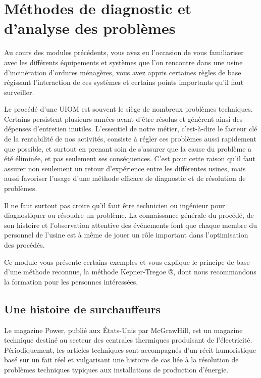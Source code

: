 
\chapter{Méthodes de diagnostic et d'analyse des problèmes}


Au cours des modules précédents, vous avez eu l’occasion de vous familiariser avec les différents équipements et systèmes que l’on rencontre dans une usine d’incinération d’ordures ménagères, vous avez appris certaines règles de base régissant l’interaction de ces systèmes et certains points importants qu’il faut surveiller.
\vspace{0.3cm}

Le procédé d’une UIOM est souvent le siège de nombreux problèmes techniques. Certains persistent plusieurs années avant d’être résolus et génèrent ainsi des dépenses d’entretien inutiles. L’essentiel de notre métier, c’est-à-dire le facteur clé de la rentabilité de nos activités, consiste à régler ces problèmes aussi rapidement que possible, et surtout en prenant soin de s’assurer que la cause du problème a été éliminée, et pas seulement ses conséquences.
C’est pour cette raison qu’il faut assurer non seulement un retour d’expérience entre les différentes usines, mais aussi favoriser l’usage d’une méthode efficace de diagnostic et de résolution de problèmes.
\vspace{0.3cm}

Il ne faut surtout pas croire qu’il faut être technicien ou ingénieur pour diagnostiquer ou résoudre un problème. La connaissance générale du procédé, de son histoire et l’observation attentive des événements font que chaque membre du personnel de l’usine est à même de jouer un rôle important dans l’optimisation des procédés.
\vspace{0.3cm}

Ce module vous présente certains exemples et vous explique le principe de base d’une méthode reconnue, la méthode Kepner-Tregoe ®, dont nous recommandons la formation pour les personnes intéressées.



\section{Une histoire de surchauffeurs}

Le magazine Power, publié aux États-Unis par McGrawHill, est un magazine technique destiné au secteur des centrales thermiques produisant de l’électricité. Périodiquement, les articles techniques sont accompagnés d’un récit humoristique basé sur un fait réel et vulgarisant une histoire de cas liée à la résolution de problèmes techniques typiques aux installations de production d’énergie.
\vspace{0.3cm}

